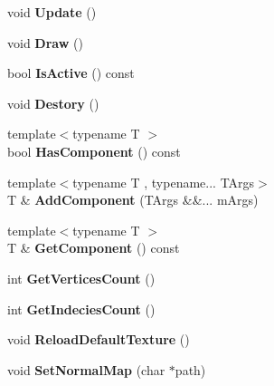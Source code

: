\begin{DoxyCompactItemize}
\item 
\mbox{\label{class_entity_a7e2a7c5df3bceaf41deea192eeba4d8f}} 
void {\bfseries Update} ()
\item 
\mbox{\label{class_entity_af0befbcbae6115851975d763e7dda312}} 
void {\bfseries Draw} ()
\item 
\mbox{\label{class_entity_a6e6a66a2cb8f47c0eaebc20511bded4f}} 
bool {\bfseries Is\+Active} () const
\item 
\mbox{\label{class_entity_a3f419b3892e967131dc358734ba5d1f0}} 
void {\bfseries Destory} ()
\item 
\mbox{\label{class_entity_a21a5c382bca76fadf22668d51439f3a6}} 
{\footnotesize template$<$typename T $>$ }\\bool {\bfseries Has\+Component} () const
\item 
\mbox{\label{class_entity_adbf1a398b64eb39ba8de7a60f9cec8dc}} 
{\footnotesize template$<$typename T , typename... T\+Args$>$ }\\T \& {\bfseries Add\+Component} (T\+Args \&\&... m\+Args)
\item 
\mbox{\label{class_entity_a770c7781e25b2f15dcab9dd75c821198}} 
{\footnotesize template$<$typename T $>$ }\\T \& {\bfseries Get\+Component} () const
\item 
\mbox{\label{class_entity_a432d34bb389776d33c8c58e0a01f0959}} 
int {\bfseries Get\+Vertices\+Count} ()
\item 
\mbox{\label{class_entity_a7498a81508ea3a5ca327ed9d86cc4860}} 
int {\bfseries Get\+Indecies\+Count} ()
\item 
\mbox{\label{class_entity_a71051d8255fdd7609819243781240c4b}} 
void {\bfseries Reload\+Default\+Texture} ()
\item 
\mbox{\label{class_entity_ad23962b7715827102869205b336059c4}} 
void {\bfseries Set\+Normal\+Map} (char $\ast$path)

\end{DoxyCompactItemize}
